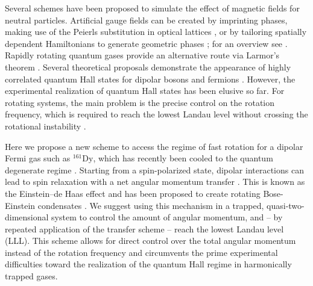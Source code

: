 Several schemes have been proposed to simulate the effect of magnetic fields for neutral particles. Artificial gauge fields can be created by imprinting phases, making use of the Peierls substitution in optical lattices \cite{Aidelsburger2011,Jimenez-Garcia2012,Struck2012}, or by tailoring spatially dependent Hamiltonians to generate geometric phases \cite{Lin2009}; for an overview see \cite{Dalibard2011}. Rapidly rotating quantum gases provide an alternative route via Larmor's theorem
\cite{Cooper2008,Fetter2009}. Several theoretical proposals demonstrate the appearance of highly correlated quantum Hall states for dipolar bosons \cite{Cooper2005} and fermions \cite{Baranov2005,Osterloh2007}. However, the experimental realization of quantum Hall states has been elusive so far. For rotating systems, the main problem is the precise control on the rotation frequency, which is required to reach the lowest Landau level without crossing the rotational instability \cite{Schweikhard2004}.


Here we propose a new scheme to access the regime of fast rotation for a dipolar Fermi gas such as $^{161}\text{Dy}$, which has recently been cooled to the quantum degenerate regime \cite{Lu2012}. Starting from a spin-polarized state, dipolar interactions can lead to spin relaxation with a net angular momentum transfer \cite{Hensler2003}. This is known as the Einstein--de Haas effect \cite{Einstein1915} and has been proposed to create rotating Bose-Einstein condensates \cite{Santos2006,Kawaguchi2006}. We suggest using this mechanism in a trapped, quasi-two-dimensional system to control the amount of angular momentum, and -- by repeated application of the transfer scheme -- reach the lowest Landau level (LLL). This scheme allows for direct control over the total angular momentum instead of the rotation frequency and circumvents the prime experimental difficulties toward the realization of the quantum Hall regime in harmonically trapped gases.





